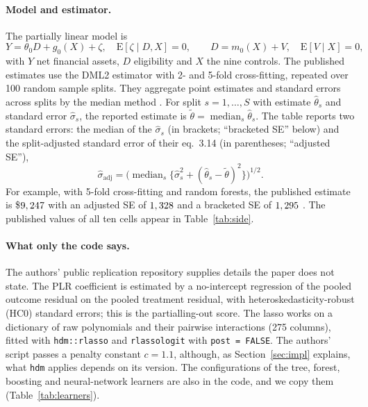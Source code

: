 \documentclass[11pt]{article}
\newcommand{\var}[1]{\texttt{#1}}
\begin{document}
\paragraph{Model and estimator.} The partially linear model is
\begin{equation}
  Y = \theta_0 D + g_0(X) + \zeta, \quad \mathrm{E}[\zeta \mid D, X] = 0, \qquad
  D = m_0(X) + V, \quad \mathrm{E}[V \mid X] = 0,
  \label{eq:plr}
\end{equation}
with $Y$ net financial assets, $D$ eligibility and $X$ the nine controls. The published
estimates use the DML2 estimator with 2- and 5-fold cross-fitting, repeated over 100
random sample splits. They aggregate point estimates and standard errors across splits
by the median method \citep{chernozhukov2018dml}. For split $s = 1, \dots, S$ with
estimate $\hat\theta_s$ and standard error $\hat\sigma_s$, the reported estimate is
$\tilde\theta = \operatorname{median}_s \hat\theta_s$. The table reports two standard
errors: the median of the $\hat\sigma_s$ (in brackets; ``bracketed SE'' below) and the
split-adjusted standard error of their eq.~3.14 (in parentheses; ``adjusted SE''),
\begin{equation}
  \hat\sigma_{\text{adj}} = \Big(\operatorname{median}_s\big\{\hat\sigma_s^2 +
  (\hat\theta_s - \tilde\theta)^2\big\}\Big)^{1/2}.
  \label{eq:adj}
\end{equation}
For example, with 5-fold cross-fitting and random forests, the published estimate is
\$$9,247$ with an adjusted SE of $1,328$ and a bracketed SE of
$1,295$
\citep[Table~2, Panel~B]{chernozhukov2018dml}. The published values of all ten cells
appear in Table~\ref{tab:side}.

\paragraph{What only the code says.} The authors' public replication repository
\citep{dmlongithub} supplies details the paper does not state. The PLR coefficient is
estimated by a no-intercept regression of the pooled outcome residual on the pooled
treatment residual, with heteroskedasticity-robust (HC0) standard errors; this is the
partialling-out score. The lasso works on a dictionary of raw polynomials and their
pairwise interactions (275 columns), fitted with \var{hdm::rlasso} and
\var{rlassologit} with \var{post = FALSE}. The authors' script passes a penalty constant
$c = 1.1$, although, as Section~\ref{sec:impl} explains, what \var{hdm} applies depends
on its version. The configurations of the tree, forest, boosting and neural-network
learners are also in the code, and we copy them (Table~\ref{tab:learners}).
\end{document}
